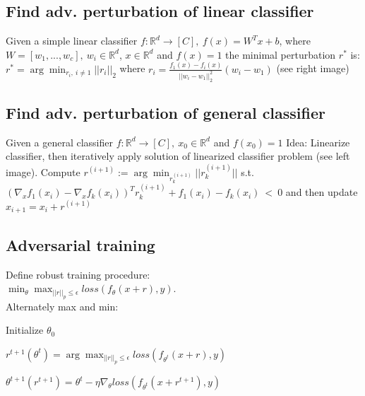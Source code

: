\subsection*{Find adv. perturbation of linear classifier}Given a simple linear classifier $f: \mathbb{R}^d \rightarrow [C],\  f(x) = W^Tx + b$, where $W = [w_1,...,w_c],\ w_i \in \mathbb{R}^d$, $x \in \mathbb{R}^d$ and $f(x) = 1$ the minimal perturbation $r^*$ is:
$r^* = \arg\min_{r_i,\ i\ne 1} ||r_i||_2$ where $r_i = \frac{f_1(x) - f_i(x)}{||w_i - w_1||_2^2}(w_i - w_1)$ (see right image)

\subsection*{Find adv. perturbation of general classifier}Given a general classifier $f: \mathbb{R}^d \rightarrow [C],\ x_0 \in \mathbb{R}^d$ and $f(x_0) = 1$ Idea: Linearize classifier, then iteratively apply solution of linearized classifier problem (see left image). Compute $r^{(i+1)} := \arg\min_{r_k^{(i+1)}} ||r_k^{(i+1)}||$ s.t.\linebreak $(\nabla_x f_1(x_i) - \nabla_x f_k(x_i))^T r_k^{(i+1)} + f_1(x_i) - f_k(x_i)\ <\ 0$\linebreak
and then update $x_{i+1} = x_i + r^{(i+1)}$

\subsection*{Adversarial training} Define robust training procedure:\\ $\min_\theta\max_{||r||_p \le \epsilon}loss(f_\theta(x+r), y)$.\\ Alternately max and min:
\begin{inparaitem}[$\color{mygreen} \triangleright$]
\item Initialize $\theta_0$

\item {}

$r^{t+1}(\theta^t) = \arg\max_{||r||_p \le \epsilon} loss(f_{\theta^t}(x+r),y)$\\
\item {}

$\theta^{t+1}(r^{t+1}) = \theta^{t} - \eta \nabla_\theta loss(f_{\theta^t}(x+r^{t+1}),y)$
\end{inparaitem}

